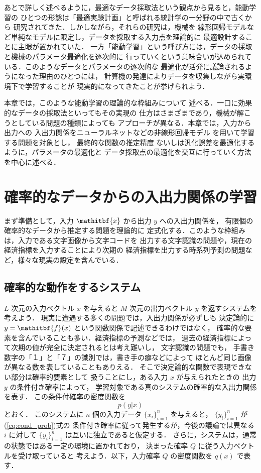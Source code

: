 \documentclass[master]{cimt}
\newcommand{\vx}{\mathitbf{x}}
\newcommand{\vf}{\mathitbf{f}}
\begin{document}
あとで詳しく述べるように，最適なデータ採取法という観点から見ると，能動学習の
ひとつの形態は「最適実験計画」と呼ばれる統計学の一分野の中で古くから
研究されてきた．しかしながら，それらの研究は，機械を
線形回帰モデルなど単純なモデルに限定し，データを採取する入力点を理論的に
最適設計することに主眼が置かれていた．
一方「能動学習」という呼び方には，データの採取と機械のパラメータ最適化を逐次的に
行っていくという意味合いが込められている．このようなデータとパラメータの逐次的な
最適化が活発に議論されるようになった理由のひとつには，
計算機の発達によりデータを収集しながら実環境下で学習することが
現実的になってきたことが挙げられよう．

本章では，このような能動学習の理論的な枠組みについて
述べる．一口に効果的なデータの採取法といってもその実現の
仕方はさまざまであり，機械が解こうとしている問題の種類によっても
アプローチが異なる．本章では，入力から出力への
入出力関係をニューラルネットなどの非線形回帰モデル
を用いて学習する問題を対象とし，
最終的な関数の推定精度
ないしは汎化誤差を最適化するように，パラメータの最適化と
データ採取点の最適化を交互に行っていく方法を中心に述べる．


\section{確率的なデータからの入出力関係の学習}

まず準備として，入力 $\vx$ から出力 $y$ への入出力関係を，
有限個の確率的なデータから推定する問題を理論的に
定式化する．このような枠組みは，入力である文字画像から文字コードを
出力する文字認識の問題や，現在の経済指標を入力することにより次期の
経済指標を出力する時系列予測の問題など，様々な現実の設定を含んでいる．


\subsection{確率的な動作をするシステム}
\label{sec:stat_learning}

$L$ 次元の入力ベクトル $x$ を与えると $M$ 次元の出力ベクトル $y$ 
を返すシステムを考えよう．
現実に遭遇する多くの問題では，入出力関係が必ずしも
決定論的に 
$
y = \vf(x)
$
という関数関係で記述できるわけではなく，
確率的な要素を含んでいることも多い．経済指標の予測などでは，
過去の経済指標によって次期の値が完全に決定されるとは考え難いし，
文字認識の問題でも，
手書き数字の「１」と「７」の識別では，書き手の癖などによって
ほとんど同じ画像が異なる数を表していることもありえる．
そこで決定論的な関数で表現できない部分は確率的要素として
扱うことにし，ある入力 $x$ が与えられたときの
出力 $y$ の条件付き確率によって，
学習対象である真のシステムの確率的な入出力関係を表す．
この条件付確率の密度関数を
\begin{equation}
\label{eq:cond_prob}
	p( y | x )
\end{equation}
とおく．
このシステムに $n$ 個の入力データ $\{ x_i\}_{i=1}^n$ を与えると，
$\{  y_i \}_{i=1}^n$ が(\ref{eq:cond_prob})式の
条件付き確率に従って発生するが，今後の議論では異なる $i$ に対して
$\{  y_i \}_{i=1}^n$ は互いに独立であると仮定する．
さらに，システムは，通常の状態ではある一定の環境に置かれており，
決まった確率 $Q$ に従う入力ベクトルを受け取っていると
考えよう．以下，入力確率 $Q$ の密度関数を $q(x)$ で表す．
\end{document}
